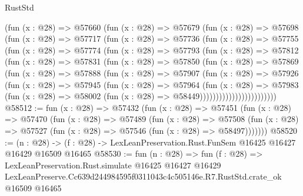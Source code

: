 \begin{lexlean}{RustStd}
\begin{coremodule}
            (fun (x : @28) =>
            @57660
              (fun (x : @28) =>
              @57679
                (fun (x : @28) =>
                @57698
                  (fun (x : @28) =>
                  @57717
                    (fun (x : @28) =>
                    @57736
                      (fun (x : @28) =>
                      @57755
                        (fun (x : @28) =>
                        @57774
                          (fun (x : @28) =>
                          @57793
                            (fun (x : @28) =>
                            @57812
                              (fun (x : @28) =>
                              @57831
                                (fun (x : @28) =>
                                @57850
                                  (fun (x : @28) =>
                                  @57869
                                    (fun (x : @28) =>
                                    @57888
                                      (fun (x : @28) =>
                                      @57907
                                        (fun (x : @28) =>
                                        @57926
                                          (fun (x : @28) =>
                                          @57945
                                            (fun (x : @28) =>
                                            @57964
                                              (fun (x : @28) =>
                                              @57983
                                                (fun (x : @28) =>
                                                @58002
                                                  (fun (x : @28) => @58449))))))))))))))))))))))))
@58512 := fun (x : @28) =>
  @57432
    (fun (x : @28) =>
    @57451
      (fun (x : @28) =>
      @57470
        (fun (x : @28) =>
        @57489
          (fun (x : @28) =>
          @57508 (fun (x : @28) => @57527 (fun (x : @28) => @57546 (fun (x : @28) => @58497)))))))
@58520 := (n : @28) ->
  (f : @28) -> LexLeanPreservation.Rust.FunSem @16425 @16427 @16429 @16509 @16465
@58530 := fun (n : @28) =>
  fun (f : @28) =>
  LexLeanPreservation.Rust.simulate
    @16425
    @16427
    @16429
    LexLeanPreserve.Cc639d244984595f0311043c4c505146e.R7.RustStd.crate_ok
    @16509
    @16465
\end{coremodule}
\end{lexlean}
